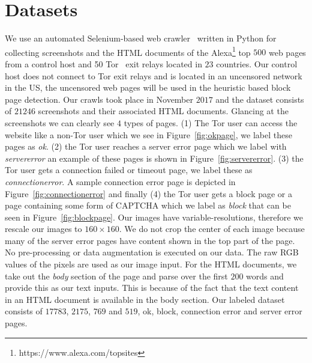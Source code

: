 \documentclass{article} %
\begin{document}
\section{Datasets} 
\label{datasets}
We use an automated Selenium-based web crawler~\cite{selenium} written in Python for collecting screenshots and the HTML documents of the Alexa\footnote{https://www.alexa.com/topsites} top $500$ web pages from a control host and 50 Tor~\cite{tor} exit relays located in $23$ countries. Our control host does not connect to Tor exit relays and is located in an uncensored network in the US, the uncensored web pages will be used in the heuristic based block page detection. Our crawls took place in November $2017$ and the dataset consists of $21246$ screenshots and their associated HTML documents. Glancing at the screenshots we can clearly see $4$ types of pages. (1) The Tor user can access the website like a non-Tor user which we see in Figure~\ref{fig:okpage}, we label these pages as \textit{ok}. (2) the Tor user reaches a server error page which we label with \textit{servererror} an example of these pages is shown in Figure~\ref{fig:servererror}. (3) the Tor user gets a connection failed or timeout page, we label these as \textit{connectionerror}. A sample connection error page is depicted in Figure~\ref{fig:connectionerror} and finally (4) the Tor user gets a block page or a page containing some form of CAPTCHA which we label as \textit{block} that can be seen in Figure~\ref{fig:blockpage}.
Our images have variable-resolutions, therefore we rescale our images to $160\times160$. We do not crop the center of each image because many of the server error pages have content shown in the top part of the page. No pre-processing or data augmentation is executed on our data. The raw RGB values of the pixels are used as our image input. For the HTML documents, we take out the \textit{body} section of the page and parse over the first $200$ words and provide this as our text inputs. This is because of the fact that the text content in an HTML document is available in the body section. Our labeled dataset consists of $17783$, $2175$, $769$ and $519$, ok, block, connection error and server error pages.
\end{document}
